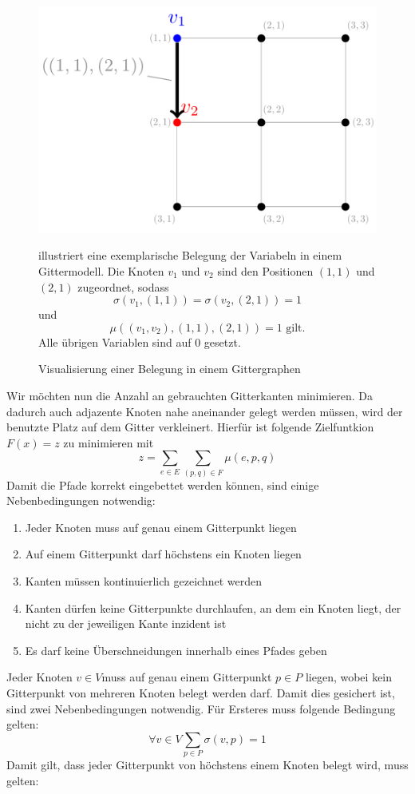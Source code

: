 \documentclass[bachelor, german]{algothesis}
\begin{document}
\begin{figure}[H]
    \begin{minipage}{0.45\textwidth}
    \centering
    \includegraphics{figures/Variabelsetzung.png}
    \caption{Visualisierung einer Belegung in einem Gittergraphen}
    \label{fig:Var_Example}
    \end{minipage}
    \begin{minipage}{0.5\textwidth}
    \small
     illustriert eine exemplarische Belegung der Variabeln in einem Gittermodell. Die Knoten $v_1$ und $v_2$ sind den Positionen $(1,1)$ und $(2,1)$ zugeordnet, sodass $$\sigma(v_1,(1,1))=\sigma(v_2,(2,1))=1$$ und $$\mu((v_1,v_2),(1,1),(2,1))=1 \text{ gilt.}$$ Alle übrigen Variablen sind auf $0$ gesetzt.
    \end{minipage}
\end{figure}
Wir möchten nun die Anzahl an gebrauchten Gitterkanten minimieren. Da dadurch auch adjazente Knoten nahe aneinander gelegt werden müssen, wird der benutzte Platz auf dem Gitter verkleinert. Hierfür ist folgende Zielfuntkion $F(x) = z$  zu minimieren mit $$z = \sum_{e \in E} \sum_{(p,q) \in F} \mu(e,p,q)$$
Damit die Pfade korrekt eingebettet werden können, sind einige Nebenbedingungen notwendig:
\begin{enumerate}[(1)]
    \item  Jeder Knoten muss auf genau einem Gitterpunkt liegen
    \item Auf einem Gitterpunkt darf höchstens ein Knoten liegen
    \item Kanten müssen kontinuierlich gezeichnet werden
    \item Kanten dürfen keine Gitterpunkte durchlaufen, an dem ein Knoten liegt, der nicht zu der jeweiligen Kante inzident ist
    \item Es darf keine Überschneidungen innerhalb eines Pfades geben
\end{enumerate}
Jeder Knoten $v \in V$muss auf genau einem Gitterpunkt $p \in P$ liegen, wobei kein Gitterpunkt von mehreren Knoten belegt werden darf. Damit dies gesichert ist, sind zwei Nebenbedingungen notwendig. Für Ersteres muss folgende Bedingung gelten: 
     \begin{equation}
\forall v \in V \sum_{p \in P} \sigma(v,p) = 1
\tag{1}
\end{equation}
Damit gilt, dass jeder Gitterpunkt von höchstens einem Knoten belegt wird, muss gelten:
\end{document}
